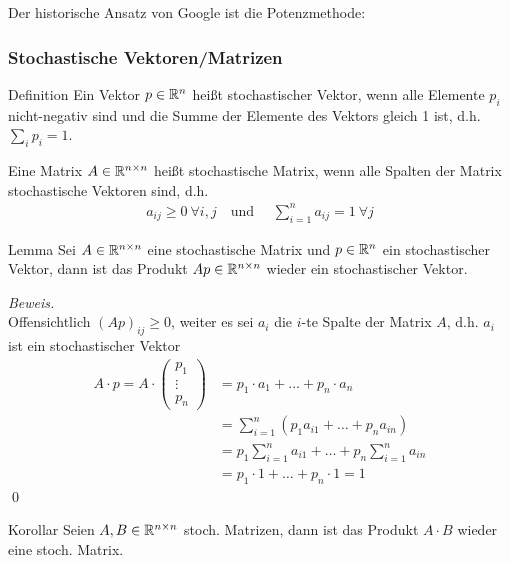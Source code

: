 Der historische Ansatz von Google ist die Potenzmethode:

\subsubsection{Stochastische Vektoren/Matrizen}
\begin{colbox}{Definition}
  Ein Vektor $p\in\mathbb R^n$ heißt stochastischer Vektor, wenn alle Elemente $p_i$ nicht-negativ sind und die 
  Summe der Elemente des Vektors gleich 1 ist, d.h. $\sum_{i} p_i = 1$. 

  Eine Matrix $A\in\mathbb R^{n\times n}$ heißt stochastische Matrix, wenn alle Spalten der Matrix stochastische 
  Vektoren sind, d.h.
  \begin{align*}
    a_{ij}\geq 0\ \forall i,j \quad \text{und } \quad \sum_{i=1}^n a_{ij}=1\ \forall j
  \end{align*}

\end{colbox}

\begin{colbox}{Lemma}
  Sei $A\in\mathbb R^{n\times n}$ eine stochastische Matrix und $p\in\mathbb R^{n}$ ein stochastischer Vektor, dann ist 
  das Produkt $Ap\in\mathbb R^{n\times n}$ wieder ein stochastischer Vektor.
\end{colbox}

\textit{Beweis.} \\
Offensichtlich $(Ap)_{ij}\geq 0$, weiter es sei $a_i$ die $i$-te Spalte der Matrix $A$, d.h. $a_i$ ist ein stochastischer Vektor
\begin{align*}
  A\cdot p = A\cdot \begin{pmatrix}
  p_1 \\ \vdots \\ p_n
\end{pmatrix} &= p_1\cdot a_1 + \dots + p_n\cdot a_n \\
&= \sum_{i=1}^n (p_1a_{i1} + \dots + p_na_{in}) \\
&= p_1\sum_{i=1}^n a_{i1} + \dots +  p_n\sum_{i=1}^na_{in} \\
&= p_1\cdot 1 + \dots + p_n\cdot 1 = 1
\end{align*}
\qed

\begin{colbox}{Korollar}\label{cor:stochMatProd}
  Seien $A,B\in\mathbb R^{n\times n}$ stoch. Matrizen, dann ist das Produkt $A\cdot B$ wieder eine stoch. Matrix.
\end{colbox}

